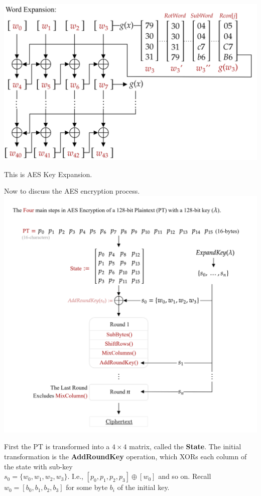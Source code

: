 \hspace{-2em}
\includegraphics[width=1\textwidth]{Sections/sec/enc/aes/recap2.png}

\vspace{1em}
\noindent
This is AES Key Expansion.

\newpage 

\noindent
Now to discuss the AES encryption process.\\
\vspace{1em}
\hspace{-3em}
\includegraphics[width=1.1\textwidth]{Sections/sec/enc/aes/trans/high.png}

\vspace{2em}
\noindent
First the PT is transformed into a $4\times4$ matrix, called the \textbf{State}. The initial transformation is the \textbf{AddRoundKey} operation,
which XORs each column of the state with sub-key\\
$s_0=\{w_0,w_1,w_2,w_3\}$. I.e., $[p_0, p_1, p_2, p_3] \oplus [w_0]$ and so on. Recall $w_0=[b_0,b_1,b_2,b_3]$ 
for some byte $b_i$ of the initial key.
\newpage 

